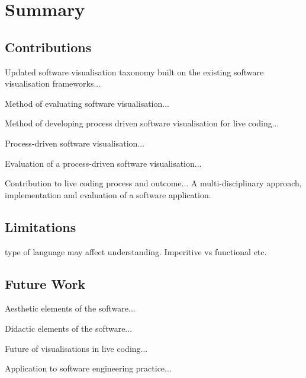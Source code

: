
\chapter{Summary}
\label{chap:summary}

\section{Contributions}

Updated software visualisation taxonomy built on the existing software visualisation frameworks...

Method of evaluating software visualisation...

Method of developing process driven software visualisation for live coding...

Process-driven software visualisation...

Evaluation of a process-driven software visualisation...

Contribution to live coding process and outcome... A multi-disciplinary approach, implementation and evaluation of a software application.

\section{Limitations}

type of language may affect understanding. Imperitive vs functional etc.

\section{Future Work}

Aesthetic elements of the software...

Didactic elements of the software...

Future of visualisations in live coding...

Application to software engineering practice...

